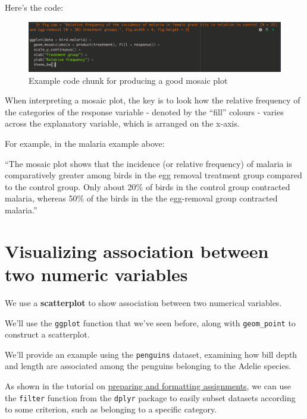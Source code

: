 \documentclass[
]{book}
\begin{document}
Here's the code:

\begin{figure}
\includegraphics[width=29.56in]{./more/mosaic_graph} \caption{Example code chunk for producing a good mosaic plot}\label{fig:unnamed-chunk-44}
\end{figure}

When interpreting a mosaic plot, the key is to look how the relative frequency of the categories of the response variable - denoted by the ``fill'' colours - varies across the explanatory variable, which is arranged on the x-axis.

For example, in the malaria example above:

``The mosaic plot shows that the incidence (or relative frequency) of malaria is comparatively greater among birds in the egg removal treatment group compared to the control group. Only about 20\% of birds in the control group contracted malaria, whereas 50\% of the birds in the the egg-removal group contracted malaria.''

\section{Visualizing association between two numeric variables}\label{two_numeric}

We use a \textbf{scatterplot} to show association between two numerical variables.

We'll use the \texttt{ggplot} function that we've seen before, along with \texttt{geom\_point} to construct a scatterplot.

We'll provide an example using the \texttt{penguins} dataset, examining how bill depth and length are associated among the penguins belonging to the Adelie species.

As shown in the tutorial on \hyperref[rmd_graphing]{preparing and formatting assignments}, we can use the \texttt{filter} function from the \texttt{dplyr} package to easily subset datasets according to some criterion, such as belonging to a specific category.
\end{document}
